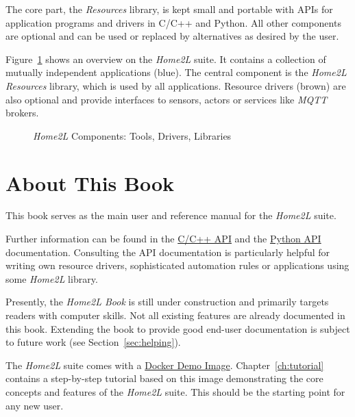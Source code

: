 \documentclass[12pt,english,parskip=half,headheight=19pt]{scrreprt}
\newcommand{\figsvg}[2][]{}            %
\newcommand{\figsvg}[2][]{\href{#2}{}} %
\newcommand{\refdoc}[2]{\href{#1}{#2}}              %
\newcommand{\theapic}{\refdoc{home2l-api_c/index.html}{C/C++ API}}
\newcommand{\theapipython}{\refdoc{home2l-api_python/index.html}{Python API}}
\begin{document}
The core part, the \textit{Resources} library, is kept small and portable with APIs
for application programs and drivers in C/C++ and Python. All other components
are optional and can be used or replaced by alternatives as desired by the user.

Figure~\ref{fig:home2l-components} shows an overview on the \textit{Home2L} suite. It contains a collection of mutually independent applications (blue). The central component is the \textit{Home2L Resources} library, which is used by all applications. Resource drivers (brown) are also optional and provide interfaces to sensors, actors or services like \textit{MQTT} brokers.

\begin{figure}[ht]
  \centering
  \figsvg[width=0.9\linewidth]{figs/home2l-components.svg}
  \caption[l]{\textit{Home2L} Components:
    \textcolor[rgb]{0.2,0.3,1.0}{Tools},
    \textcolor[rgb]{0.5,0.25,0}{Drivers},
    \textcolor[rgb]{0,0.5,0}{Libraries}
  }
  \label{fig:home2l-components}
\end{figure}




\clearpage
\section{About This Book}
\label{sec:intro-about}

This book serves as the main user and reference manual for the \textit{Home2L} suite.

Further information can be found in the \theapic{} and the \theapipython{} documentation.
Consulting the API documentation is particularly helpful for writing own resource drivers,
sophisticated automation rules or applications using some \textit{Home2L} library.

Presently, the \textit{Home2L Book} is still under construction and primarily targets readers
with computer skills. Not all existing features are already documented in this book.
Extending the book to provide good end-user documentation is subject to future work
(see Section~\ref{sec:helping}).

The \textit{Home2L} suite comes with a \hyperref[sec:tutorial-start]{Docker Demo Image}. Chapter~\ref{ch:tutorial} contains a step-by-step tutorial based on this image demonstrating the core concepts and features of the \textit{Home2L} suite. This should be the starting point for any new user.
\end{document}

